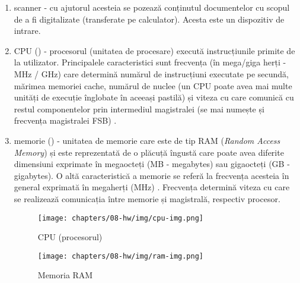 \begin{enumerate}
  \item scanner - cu ajutorul acesteia se pozează conținutul documentelor
          cu scopul de a fi digitalizate (transferate pe calculator).
          Acesta este un dispozitiv de intrare.
  \item CPU () - procesorul (unitatea de procesare) execută instrucțiunile
          primite de la utilizator. Principalele caracteristici sunt
          frecvența (în mega/giga herți - MHz / GHz) care determină numărul
          de instrucțiuni executate pe secundă, mărimea memoriei cache,
          numărul de nuclee (un CPU poate avea mai multe unități de
          execuție înglobate în aceeași pastilă) și viteza cu care
          comunică cu restul componentelor prin intermediul magistralei
          (se mai numește și frecvența magistralei FSB)
          .

  \item memorie () - unitatea de memorie care este de tip RAM
     (\textit{Random Access Memory}) și
          este reprezentată de o plăcuță îngustă care poate avea diferite
          dimensiuni exprimate în megaocteți (MB  -
          megabytes) sau gigaocteți (GB  -
          gigabytes). O altă caracteristică a memorie se referă la
          frecvența acesteia în general exprimată în megaherți (MHz)
          . Frecvența determină viteza cu care
          se realizează comunicația între memorie și magistrală, respectiv
          procesor.

\begin{figure}[!htbp]
  \centering
  \texttt{[image: chapters/08-hw/img/cpu-img.png]}
  \caption{CPU (procesorul)\protect\footnotemark}
  \label{fig:hw:cpu}
\end{figure}

\begin{figure}[!htbp]
  \centering
  \texttt{[image: chapters/08-hw/img/ram-img.png]}
  \caption{Memoria RAM\protect\footnotemark}
  \label{fig:hw:ram}
\end{figure}


\end{enumerate}
